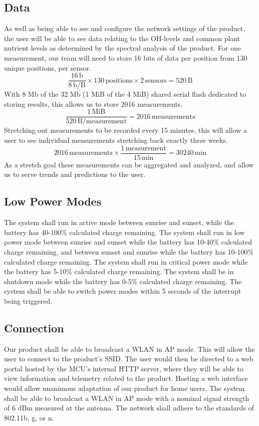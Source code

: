 \documentclass[journal]{IEEEtran}
\begin{document}
\subsection{Data} As well as being able to see and configure the network settings of the product, the user will be able to see data relating to the OH-levels and common plant nutrient levels as determined by the spectral analysis of the product. For one measurement, our team will need to store 16 bits of data per position from 130 unique positions, per sensor.
\begin{equation}
    \frac{16\,\mathrm{b}}{8\,\mathrm{b/B}}\times 130\,\mathrm{positions} \times 2\,\mathrm{sensors} = 520\,\mathrm{B}
\end{equation}
With 8 Mb of the 32 Mb (1 MiB of the 4 MiB) shared serial flash dedicated to storing results, this allows us to store 2016 measurements.
\begin{equation}
    \frac{1\,\mathrm{MiB}}{520\,\mathrm{B/measurement}} = 2016\,\mathrm{measurements}
\end{equation}
Stretching out measurements to be recorded every 15 minutes, this will allow a user to see individual measurements stretching back exactly three weeks.
\begin{equation}
    2016\,\mathrm{measurements} \times \frac{1\,\mathrm{measurement}}{15\,\mathrm{min}} = 30240\,\mathrm{min} 
\end{equation}
As a stretch goal these measurements can be aggregated and analyzed, and allow us to serve trends and predictions to the user.

\subsection{Low Power Modes} The system shall run in active mode between sunrise and sunset, while the battery has 40-100\% calculated charge remaining. The system shall run in low power mode between sunrise and sunset while the battery has 10-40\% calculated charge remaining, and between sunset and sunrise while the battery has 10-100\% calculated charge remaining. The system shall run in critical power mode while the battery has 5-10\% calculated charge remaining. The system shall be in shutdown mode while the battery has 0-5\% calculated charge remaining. The system shall be able to switch power modes within 5 seconds of the interrupt being triggered.

\subsection{Connection}
Our product shall be able to broadcast a WLAN in AP mode. This will allow the user to connect to the product's SSID. The user would then be directed to a web portal hosted by the MCU's internal HTTP server, where they will be able to view information and telemetry related to the product. Hosting a web interface would allow unanimous adaptation of our product for home users. The system shall be able to broadcast a WLAN in AP mode with a nominal signal strength of 6 dBm measured at the antenna. The network shall adhere to the standards of 802.11b, g, or n. 
\end{document}
